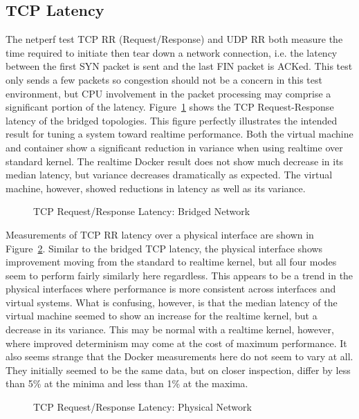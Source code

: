 \subsection{TCP Latency} %
\label{sub:tcplatency}
The netperf test TCP RR (Request/Response) and UDP RR both measure the time required to initiate then tear down a network connection, i.e. the latency between the first SYN packet is sent and the last FIN packet is ACKed.  
This test only sends a few packets so congestion should not be a concern in this test environment, but CPU involvement in the packet processing may comprise a significant portion of the latency.  
Figure~\ref{fig:tcp_rr_bridge} shows the TCP Request-Response latency of the bridged topologies.
This figure perfectly illustrates the intended result for tuning a system toward realtime performance.
Both the virtual machine and container show a significant reduction in variance when using realtime over standard kernel.
The realtime Docker result does not show much decrease in its median latency, but variance decreases dramatically as expected.
The virtual machine, however, showed reductions in latency as well as its variance.

\begin{figure}
    \centering
    \def\svgwidth{\columnwidth}
    
    \caption{TCP Request/Response Latency: Bridged Network}
    \label{fig:tcp_rr_bridge}
\end{figure}

Measurements of TCP RR latency over a physical interface are shown in Figure~\ref{fig:tcp_rr_phys}.  
Similar to the bridged TCP latency, the physical interface shows improvement moving from the standard to realtime kernel, but all four modes seem to perform fairly similarly here regardless.
This appears to be a trend in the physical interfaces where performance is more consistent across interfaces and virtual systems.
What is confusing, however, is that the median latency of the virtual machine seemed to show an increase for the realtime kernel, but a decrease in its variance.  
This may be normal with a realtime kernel, however, where improved determinism may come at the cost of maximum performance.  
It also seems strange that the Docker measurements here do not seem to vary at all.  
They initially seemed to be the same data, but on closer inspection, differ by less than 5\% at the minima and less than 1\% at the maxima.

\begin{figure}
    \centering
    \def\svgwidth{\columnwidth}
    
    \caption{TCP Request/Response Latency: Physical Network}
    \label{fig:tcp_rr_phys}
\end{figure}

